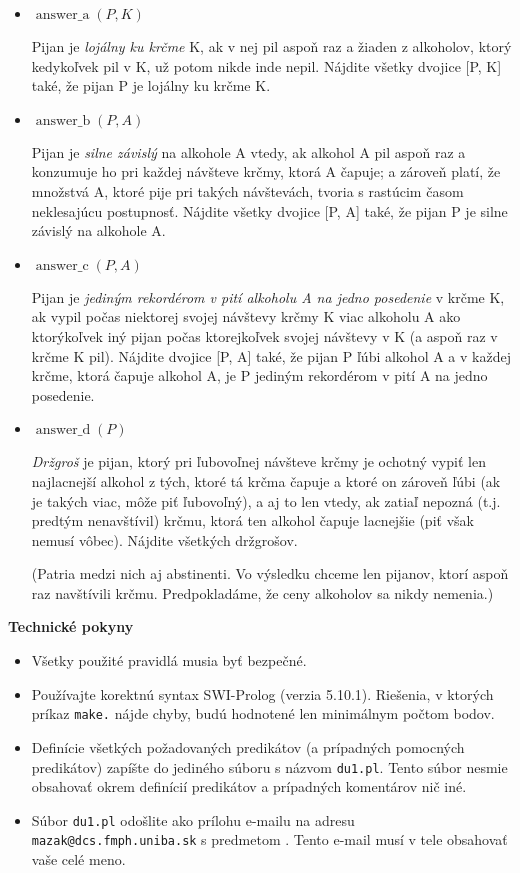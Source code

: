 \documentclass[10pt, a4paper]{article}
\DeclareMathOperator{\answera}{answer\_a}
\DeclareMathOperator{\answerb}{answer\_b}
\DeclareMathOperator{\answerc}{answer\_c}
\DeclareMathOperator{\answerd}{answer\_d}
\begin{document}
\begin{itemize}
\item $\answera(P, K)$

Pijan je \emph{lojálny ku krčme} K, ak v nej pil aspoň raz a žiaden z alkoholov, ktorý
kedykoľvek pil v K, už potom nikde inde nepil.
Nájdite všetky dvojice [P, K] také, že pijan P je lojálny ku krčme K.

\item $\answerb(P, A)$

Pijan je \emph{silne závislý} na alkohole A vtedy, ak
alkohol A pil aspoň raz a konzumuje ho pri každej návšteve krčmy, ktorá A čapuje; a zároveň platí, že
množstvá A, ktoré pije pri takých návštevách, tvoria s rastúcim časom neklesajúcu
postupnosť. Nájdite všetky dvojice [P, A] také, že pijan P je silne
závislý na alkohole A.

\item $\answerc(P, A)$

Pijan je \emph{jediným rekordérom v pití alkoholu A na jedno posedenie} v
krčme K, ak vypil počas niektorej svojej návštevy krčmy K viac
alkoholu A ako ktorýkoľvek iný pijan počas ktorejkoľvek svojej
návštevy v K (a aspoň raz v krčme K pil). Nájdite dvojice [P, A] také, že pijan P ľúbi alkohol A a
v každej krčme, ktorá čapuje alkohol A, je P jediným rekordérom v pití A na
jedno posedenie.

\item $\answerd(P)$

\emph{Držgroš} je pijan, ktorý pri ľubovoľnej návšteve krčmy je ochotný vypiť len najlacnejší alkohol z tých, ktoré tá krčma čapuje a ktoré on zároveň ľúbi (ak je takých viac, môže piť ľubovoľný), a aj to len vtedy, ak zatiaľ nepozná (t.j. predtým nenavštívil)
krčmu, ktorá ten alkohol čapuje lacnejšie (piť však nemusí vôbec). Nájdite všetkých držgrošov.

(Patria medzi nich aj abstinenti. Vo výsledku chceme len pijanov, ktorí aspoň raz navštívili krčmu. Predpokladáme, že ceny alkoholov sa
nikdy nemenia.)
\end{itemize}

\bigskip 
\bigskip 

\centerline{\bf\large Technické pokyny}

\bigskip

\begin{itemize}
\item Všetky použité pravidlá musia byť bezpečné.
\item Používajte korektnú syntax SWI-Prolog (verzia 5.10.1). Riešenia, v ktorých príkaz {\tt make.} nájde chyby, budú hodnotené len minimálnym počtom bodov.
\item Definície všetkých požadovaných predikátov (a prípadných pomocných predikátov) zapíšte do jediného súboru s názvom {\tt du1.pl}. Tento súbor nesmie obsahovať okrem definícií predikátov a prípadných komentárov nič iné.
\item Súbor {\tt du1.pl} odošlite ako prílohu e-mailu na adresu {\tt mazak@dcs.fmph.uniba.sk} s predmetom . Tento e-mail musí v tele obsahovať vaše celé meno.
\end{itemize}
\end{document}
